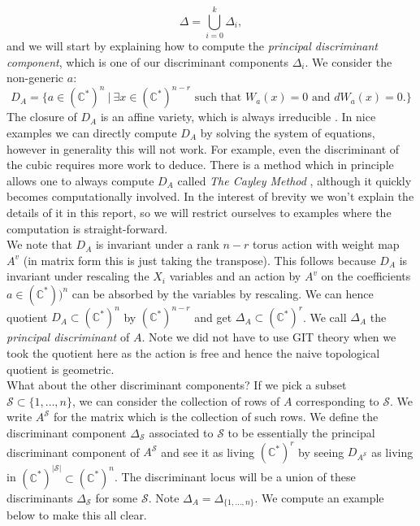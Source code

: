 \documentclass[oneside,reqno]{amsart}
\theoremstyle{definition}
\theoremstyle{definition}
\theoremstyle{definition}
\theoremstyle{definition}
\newcommand{\CC}{\mathbb{C}}
\begin{document}
$$
\Delta = \bigcup_{i=0}^k \Delta_i,
$$
and we will start by explaining how to compute the \textit{principal discriminant component}, which is one of our discriminant components $\Delta_i$. We consider the non-generic $a$:
$$
D_A= \{ a \in (\CC^*)^n \: | \: \exists x \in(\CC^*)^{n-r} \text{ such that $W_a(x) =0$ and $dW_a(x) =0.$} \}
$$
The closure of $D_A$ is an affine variety, which is always irreducible \cite[Ch. 9]{gelfand1994discriminants}. In nice examples we can directly compute $D_A$ by solving the system of equations, however in generality this will not work. For example, even the discriminant of the cubic requires more work to deduce. There is a method which in principle allows one to always compute $D_A$ called \textit{The Cayley Method} \cite[Ch. 2]{gelfand1994discriminants}, although it quickly becomes computationally involved. In the interest of brevity we won't explain the details of it in this report, so we will restrict ourselves to examples where the computation is straight-forward.\\
\newline
We note that $D_A$ is invariant under a rank $n-r$ torus action with weight map $A^v$ (in matrix form this is just taking the transpose). This follows because $D_A$ is invariant under rescaling the $X_i$ variables and an action by $A^v$ on the coefficients $a \in (\CC^*))^{n}$ can be absorbed by the variables by rescaling. We can hence quotient $D_A \subset (\CC^*)^n$ by $(\CC^*)^{n-r}$ and get $\Delta_A \subset (\CC^*)^r$. We call $\Delta_A$ the \textit{principal discriminant} of $A$. Note we did not have to use GIT theory when we took the quotient here as the action is free and hence the naive topological quotient is geometric. \\
\newline
What about the other discriminant components? If we pick a subset $\mathcal{S} \subset \{1, \dots, n \}$, we can consider the collection of rows of $A$ corresponding to $\mathcal{S}$. We write $A^{\mathcal{S}}$ for the matrix which is the collection of such rows. We define the discriminant component $\Delta_{\mathcal{S}}$ associated to $\mathcal{S}$ to be essentially the principal discriminant component of $A^{\mathcal{S}}$ and see it as living $(\CC^*)^r$ by seeing $D_{A^{\mathcal{S}}}$ as living in $(\CC^*)^{|\mathcal{S}|} \subset (\CC^*)^{n} $. The discriminant locus will be a union of these discriminants $\Delta_{\mathcal{S}}$ for some $\mathcal{S}$. Note $\Delta_A = \Delta_{\{1,\dots,n \}}$. We compute an example below to make this all clear.
\end{document}

